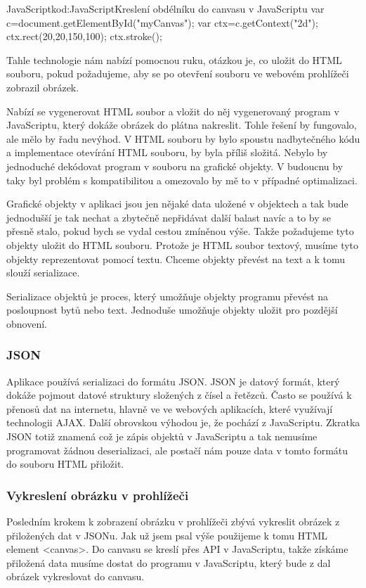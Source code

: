\documentclass[
  field=inf,
  biblatex,
  glossaries,
  index
]{kidiplom}
\begin{document}
\begin{kicode}{JavaScript}{kod:JavaScript}{Kreslení obdélníku do canvasu v JavaScriptu}
var c=document.getElementById("myCanvas");
var ctx=c.getContext("2d");
ctx.rect(20,20,150,100);
ctx.stroke();
\end{kicode}

Tahle technologie nám nabízí pomocnou ruku, otázkou je, co uložit do HTML souboru, pokud požadujeme, aby se po otevření souboru ve webovém prohlížeči zobrazil obrázek.

Nabízí se vygenerovat HTML soubor a vložit do něj vygenerovaný program v JavaScriptu, který dokáže obrázek do plátna nakreslit. Tohle řešení by fungovalo, ale mělo by řadu nevýhod. V HTML souboru by bylo spoustu nadbytečného kódu a implementace otevírání HTML souboru, by byla příliš složitá. Nebylo by jednoduché dekódovat program v souboru na grafické objekty. V budoucnu by taky byl problém s kompatibilitou a omezovalo by mě to v případné optimalizaci.

Grafické objekty v aplikaci jsou jen nějaké data uložené v objektech a tak bude jednodušší je tak nechat a zbytečně nepřidávat další balast navíc a to by se přesně stalo, pokud bych se vydal cestou zmíněnou výše. Takže požadujeme tyto objekty uložit do HTML souboru. Protože je HTML soubor textový, musíme tyto objekty reprezentovat pomocí textu. Chceme objekty převést na text a k tomu slouží serializace.

Serializace objektů je proces, který umožňuje objekty programu převést na posloupnost bytů nebo text. Jednoduše umožňuje objekty uložit pro pozdější obnovení.



\subsubsection{JSON}
Aplikace používá serializaci do formátu JSON. JSON je datový formát, který dokáže pojmout datové struktury složených z čísel a řetězců. Často se používá k přenosů dat na internetu, hlavně ve ve webových aplikacích, které využívají technologii AJAX. Další obrovskou výhodou je, že pochází z JavaScriptu. Zkratka JSON totiž znamená  což je zápis objektů v JavaScriptu a tak nemusíme programovat žádnou deserializaci, ale postačí nám pouze data v tomto formátu do souboru HTML přiložit.


\subsubsection{Vykreslení obrázku v prohlížeči}
Posledním krokem k zobrazení obrázku v prohlížeči zbývá vykreslit obrázek z přiložených dat v JSONu. Jak už jsem psal výše použijeme k tomu HTML element <canvas>. Do canvasu se kreslí přes API v JavaScriptu, takže získáme přiložená data musíme dostat do programu v JavaScriptu, který bude z dal obrázek vykreslovat do canvasu. 
\end{document}

